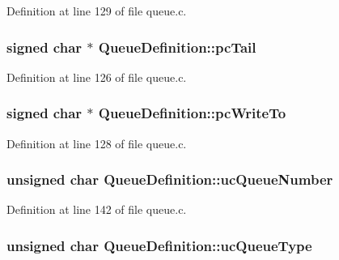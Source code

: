 Definition at line 129 of file queue.\-c.

\hypertarget{struct_queue_definition_a60913ddc7ca663b67ebfeb3c0d9fd5a0}{
\subsubsection[{pc\-Tail}]{\setlength{\rightskip}{0pt plus 5cm}signed char $\ast$ Queue\-Definition\-::pc\-Tail}}\label{struct_queue_definition_a60913ddc7ca663b67ebfeb3c0d9fd5a0}


Definition at line 126 of file queue.\-c.

\hypertarget{struct_queue_definition_ad2d44e69d540b157de31c782c35be7dd}{
\subsubsection[{pc\-Write\-To}]{\setlength{\rightskip}{0pt plus 5cm}signed char $\ast$ Queue\-Definition\-::pc\-Write\-To}}\label{struct_queue_definition_ad2d44e69d540b157de31c782c35be7dd}


Definition at line 128 of file queue.\-c.

\hypertarget{struct_queue_definition_a13f1f6255bf39265592b38e5cd2d15db}{
\subsubsection[{uc\-Queue\-Number}]{\setlength{\rightskip}{0pt plus 5cm}unsigned char Queue\-Definition\-::uc\-Queue\-Number}}\label{struct_queue_definition_a13f1f6255bf39265592b38e5cd2d15db}


Definition at line 142 of file queue.\-c.

\hypertarget{struct_queue_definition_a4fe5b767259ad9ea324ddb12e62cf243}{
\subsubsection[{uc\-Queue\-Type}]{\setlength{\rightskip}{0pt plus 5cm}unsigned char Queue\-Definition\-::uc\-Queue\-Type}}\label{struct_queue_definition_a4fe5b767259ad9ea324ddb12e62cf243}



